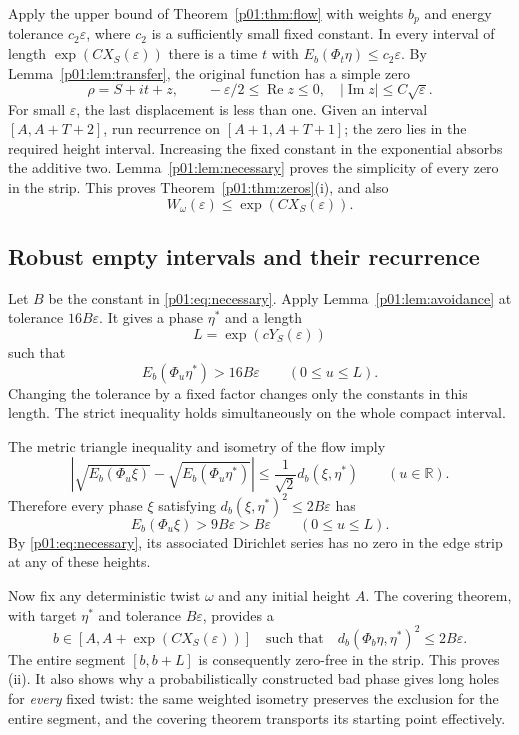 \documentclass[11pt,letterpaper]{article}
\theoremstyle{definition}
\theoremstyle{remark}
\newcommand{\R}{\mathbb R}
\newcommand{\eps}{\varepsilon}
\newcommand{\Ree}{\operatorname{Re}}
\newcommand{\Imm}{\operatorname{Im}}
\newcommand{\1}{\mathbf 1}
\begin{document}
Apply the upper bound of Theorem~\ref{p01:thm:flow} with weights $b_p$ and
energy tolerance $c_2\eps$, where $c_2$ is a sufficiently small fixed
constant. In every interval of length
$\exp(CX_S(\eps))$ there is a time $t$ with
$E_b(\Phi_t\eta)\le c_2\eps$. By
Lemma~\ref{p01:lem:transfer}, the original function has a simple zero
\[
 \rho=S+it+z,\qquad -\eps/2\le\Ree z\le0,
 \quad |\Imm z|\le C\sqrt\eps.
\]
For small $\eps$, the last displacement is less than one. Given an
interval $[A,A+T+2]$, run recurrence on $[A+1,A+T+1]$; the zero lies
in the required height interval. Increasing the fixed constant in
the exponential absorbs the additive two. Lemma~\ref{p01:lem:necessary}
proves the simplicity of every zero in the strip. This proves
Theorem~\ref{p01:thm:zeros}(i), and also
\begin{equation}\label{p01:eq:waitupper}
 W_\omega(\eps)\le\exp(CX_S(\eps)).
\end{equation}

\subsection{Robust empty intervals and their recurrence}

Let $B$ be the constant in \eqref{p01:eq:necessary}. Apply
Lemma~\ref{p01:lem:avoidance} at tolerance $16B\eps$. It gives a phase
$\eta^*$ and a length
\[
 L=\exp(cY_S(\eps))
\]
such that
\begin{equation}\label{p01:eq:robustbad}
 E_b(\Phi_u\eta^*)>16B\eps\qquad(0\le u\le L).
\end{equation}
Changing the tolerance by a fixed factor changes only the constants
in this length. The strict inequality holds simultaneously on the
whole compact interval.

The metric triangle inequality and isometry of the flow imply
\begin{equation}\label{p01:eq:metrictransport}
 \left|\sqrt{E_b(\Phi_u\xi)}
             -\sqrt{E_b(\Phi_u\eta^*)}\right|
 \le\frac1{\sqrt2}d_b(\xi,\eta^*)
 \qquad(u\in\R).
\end{equation}
Therefore every phase $\xi$ satisfying
$d_b(\xi,\eta^*)^2\le2B\eps$ has
\[
 E_b(\Phi_u\xi)>9B\eps>B\eps\qquad(0\le u\le L).
\]
By \eqref{p01:eq:necessary}, its associated Dirichlet series has no zero
in the edge strip at any of these heights.

Now fix any deterministic twist $\omega$ and any initial height $A$.
The covering theorem, with target $\eta^*$ and tolerance $B\eps$,
provides a
\[
 b\in[A,A+\exp(CX_S(\eps))]
 \quad\text{such that}\quad
 d_b(\Phi_b\eta,\eta^*)^2\le2B\eps.
\]
The entire segment $[b,b+L]$ is consequently zero-free in the strip.
This proves (ii). It also shows why a probabilistically constructed
bad phase gives long holes for \emph{every} fixed twist: the same
weighted isometry preserves the exclusion for the entire segment,
and the covering theorem transports its starting point effectively.
\end{document}
